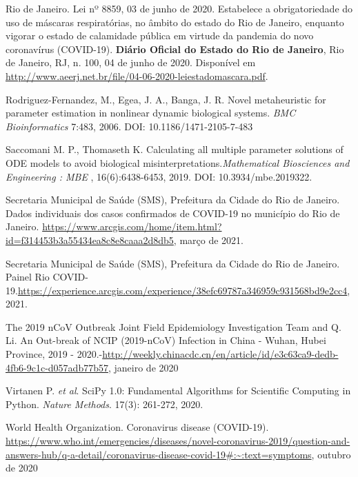 Rio de Janeiro. Lei nº 8859, 03 de junho de 2020. Estabelece a obrigatoriedade do uso de máscaras respiratórias, no âmbito do estado do Rio de Janeiro, enquanto vigorar o estado de calamidade pública em virtude da pandemia do novo coronavírus (COVID-19). {\bf Diário Oficial do Estado do Rio de Janeiro}, Rio de Janeiro, RJ, n. 100, 04 de junho de 2020. Disponível em \url{http://www.aeerj.net.br/file/04-06-2020-leiestadomascara.pdf}. 

Rodriguez-Fernandez, M., Egea, J. A., Banga, J. R. Novel metaheuristic for parameter estimation in nonlinear dynamic biological systems. {\it BMC Bioinformatics} 7:483, 2006. DOI: 10.1186/1471-2105-7-483

Saccomani M. P., Thomaseth K. Calculating all multiple parameter solutions of
ODE models to avoid biological misinterpretations.{\it Mathematical
Biosciences and Engineering : MBE }, 16(6):6438-6453, 2019. DOI:
10.3934/mbe.2019322.

Secretaria Municipal de Saúde (SMS), Prefeitura da Cidade do Rio de Janeiro. Dados individuais dos casos confirmados de COVID-19 no município do Rio de Janeiro. \url{https://www.arcgis.com/home/item.html?id=f314453b3a55434ea8c8e8caaa2d8db5}, março de 2021.

Secretaria Municipal de Saúde (SMS), Prefeitura da Cidade do Rio de Janeiro. Painel Rio COVID-19.\url{https://experience.arcgis.com/experience/38efc69787a346959c931568bd9e2cc4}, 2021.

The 2019 nCoV Outbreak Joint Field Epidemiology Investigation Team and Q. Li.
An Out-break of NCIP (2019-nCoV) Infection in China - Wuhan, Hubei Province,
2019 -
2020.-\url{http://weekly.chinacdc.cn/en/article/id/e3c63ca9-dedb-4fb6-9c1c-d057adb77b57},
janeiro de 2020

Virtanen P. {\it et al}. SciPy 1.0: Fundamental Algorithms for Scientific Computing
in Python. {\it Nature Methods}. 17(3): 261-272, 2020. 

World Health Organization. Coronavirus disease (COVID-19).
\url{https://www.who.int/emergencies/diseases/novel-coronavirus-2019/question-and-answers-hub/q-a-detail/coronavirus-disease-covid-19#:~:text=symptoms},
outubro de 2020